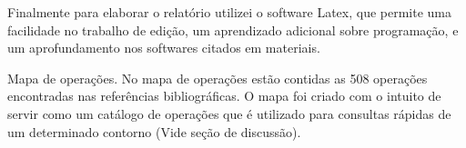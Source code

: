 \documentclass[11pt]{article}
\begin{document}
Finalmente para elaborar o relatório utilizei o software Latex, que
permite uma facilidade no trabalho de edição, um aprendizado adicional
sobre programação, e um aprofundamento nos softwares citados em
materiais.

\label{sec:resultados}


Mapa de operações. No mapa de operações estão contidas as 508 operações
encontradas nas referências bibliográficas. O mapa foi criado com o intuito de
servir como um catálogo de operações que é utilizado para consultas rápidas
de um determinado contorno (Vide seção de discussão).
\end{document}
